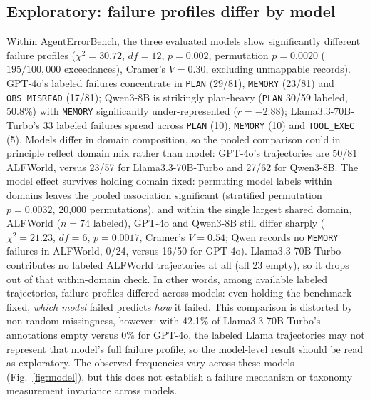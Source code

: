 \documentclass[12pt,letterpaper]{article}
\begin{document}
\subsection{Exploratory: failure profiles differ by model}
\label{sec:model}
Within AgentErrorBench, the three evaluated models show significantly
different failure profiles ($\chi^2{=}30.72$, $df{=}12$, $p{=}0.002$,
permutation $p{=}0.0020$ ($195/100{,}000$ exceedances),
Cramer's $V{=}0.30$, excluding unmappable records). GPT-4o's labeled failures
concentrate in \texttt{PLAN} (29/81), \texttt{MEMORY} (23/81) and
\texttt{OBS\_MISREAD} (17/81); Qwen3-8B is strikingly plan-heavy
(\texttt{PLAN} 30/59 labeled, 50.8\%) with \texttt{MEMORY} significantly
under-represented ($r{=}-2.88$); Llama3.3-70B-Turbo's 33 labeled failures
spread across \texttt{PLAN} (10), \texttt{MEMORY} (10) and
\texttt{TOOL\_EXEC} (5). Models differ in domain composition, so the pooled
comparison could in principle reflect domain mix rather than model:
GPT-4o's trajectories are 50/81 ALFWorld, versus 23/57 for
Llama3.3-70B-Turbo and 27/62 for Qwen3-8B. The model effect survives
holding domain fixed: permuting model labels within domains leaves the
pooled association significant (stratified permutation $p{=}0.0032$,
20,000 permutations), and within the single largest shared domain,
ALFWorld ($n{=}74$ labeled), GPT-4o and Qwen3-8B still differ sharply
($\chi^2{=}21.23$, $df{=}6$, $p{=}0.0017$, Cramer's $V{=}0.54$; Qwen
records no \texttt{MEMORY} failures in ALFWorld, 0/24, versus 16/50 for
GPT-4o). Llama3.3-70B-Turbo contributes no labeled ALFWorld trajectories
at all (all 23 empty), so it drops out of that within-domain check.
In other words, among available labeled
trajectories, failure profiles differed across models: even holding the
benchmark fixed, \emph{which model} failed predicts \emph{how} it failed.
This comparison is distorted by non-random missingness, however: with 42.1\%
of Llama3.3-70B-Turbo's annotations empty versus 0\% for GPT-4o, the labeled
Llama trajectories may not represent that model's full failure profile, so
the model-level result should be read as exploratory. The observed frequencies vary across these models (Fig.~\ref{fig:model}),
but this does not establish a failure mechanism or taxonomy measurement
invariance across models.
\end{document}
